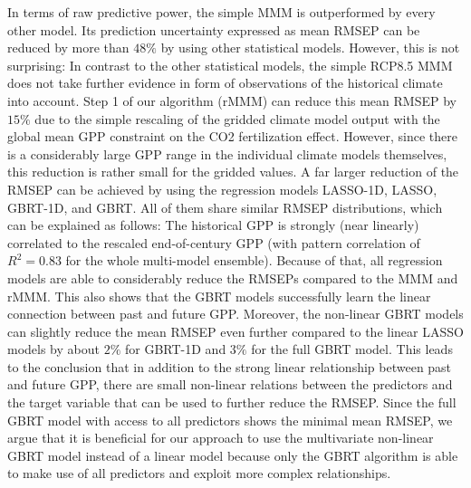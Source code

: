 In terms of raw predictive power, the simple \ac{MMM} is outperformed by every
other model. Its prediction uncertainty expressed as mean \ac{RMSEP} can be
reduced by more than $48 \unit{\%}$ by using other statistical models. However,
this is not surprising: In contrast to the other statistical models, the simple
\acs{RCP}8.5 \ac{MMM} does not take further evidence in form of observations of
the historical climate into account. Step 1 of our algorithm (r\acs{MMM}) can
reduce this mean \ac{RMSEP} by $15 \unit{\%}$ due to the simple rescaling of
the gridded climate model output with the global mean \ac{GPP} constraint on
the \ac{CO2} fertilization effect. However, since there is a considerably large
\ac{GPP} range in the individual climate models themselves, this reduction is
rather small for the gridded values. A far larger reduction of the \ac{RMSEP}
can be achieved by using the regression models \acs{LASSO}-1D, \ac{LASSO},
\acs{GBRT}-1D, and \ac{GBRT}. All of them share similar \ac{RMSEP}
distributions, which can be explained as follows: The historical \ac{GPP} is
strongly (near linearly) correlated to the rescaled end-of-century \ac{GPP}
(with pattern correlation of $R^2 = 0.83$ for the whole multi-model ensemble).
Because of that, all regression models are able to considerably reduce the
\acp{RMSEP} compared to the \ac{MMM} and r\acs{MMM}. This also shows that the
\ac{GBRT} models successfully learn the linear connection between past and
future \ac{GPP}. Moreover, the non-linear \ac{GBRT} models can slightly reduce
the mean \ac{RMSEP} even further compared to the linear \ac{LASSO} models by
about $2 \unit{\%}$ for \acs{GBRT}-1D and $3 \unit{\%}$ for the full \ac{GBRT}
model. This leads to the conclusion that in addition to the strong linear
relationship between past and future \ac{GPP}, there are small non-linear
relations between the predictors and the target variable that can be used to
further reduce the \ac{RMSEP}. Since the full \ac{GBRT} model with access to
all predictors shows the minimal mean \ac{RMSEP}, we argue that it is
beneficial for our approach to use the multivariate non-linear \ac{GBRT} model
instead of a linear model because only the \ac{GBRT} algorithm is able to make
use of all predictors and exploit more complex relationships.

